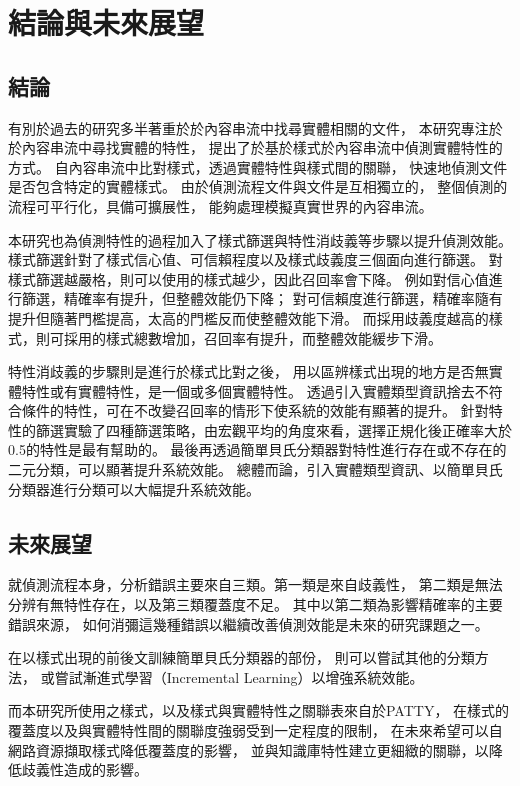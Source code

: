 %
%
%
\chapter{結論與未來展望}
\label{c:future}

\section{結論}
有別於過去的研究多半著重於於內容串流中找尋實體相關的文件，
本研究專注於於內容串流中尋找實體的特性，
提出了於基於樣式於內容串流中偵測實體特性的方式。
自內容串流中比對樣式，透過實體特性與樣式間的關聯，
快速地偵測文件是否包含特定的實體樣式。
由於偵測流程文件與文件是互相獨立的，
整個偵測的流程可平行化，具備可擴展性，
能夠處理模擬真實世界的內容串流。

本研究也為偵測特性的過程加入了樣式篩選與特性消歧義等步驟以提升偵測效能。
樣式篩選針對了樣式信心值、可信賴程度以及樣式歧義度三個面向進行篩選。
對樣式篩選越嚴格，則可以使用的樣式越少，因此召回率會下降。
例如對信心值進行篩選，精確率有提升，但整體效能仍下降；
對可信賴度進行篩選，精確率隨有提升但隨著門檻提高，太高的門檻反而使整體效能下滑。
而採用歧義度越高的樣式，則可採用的樣式總數增加，召回率有提升，而整體效能緩步下滑。

特性消歧義的步驟則是進行於樣式比對之後，
用以區辨樣式出現的地方是否無實體特性或有實體特性，是一個或多個實體特性。
透過引入實體類型資訊捨去不符合條件的特性，可在不改變召回率的情形下使系統的效能有顯著的提升。
針對特性的篩選實驗了四種篩選策略，由宏觀平均的角度來看，選擇正規化後正確率大於0.5的特性是最有幫助的。
最後再透過簡單貝氏分類器對特性進行存在或不存在的二元分類，可以顯著提升系統效能。
總體而論，引入實體類型資訊、以簡單貝氏分類器進行分類可以大幅提升系統效能。

\section{未來展望}
就偵測流程本身，分析錯誤主要來自三類。第一類是來自歧義性，
第二類是無法分辨有無特性存在，以及第三類覆蓋度不足。
其中以第二類為影響精確率的主要錯誤來源，
如何消彌這幾種錯誤以繼續改善偵測效能是未來的研究課題之一。

在以樣式出現的前後文訓練簡單貝氏分類器的部份，
則可以嘗試其他的分類方法，
或嘗試漸進式學習（Incremental Learning）以增強系統效能。

而本研究所使用之樣式，以及樣式與實體特性之關聯表來自於PATTY，
在樣式的覆蓋度以及與實體特性間的關聯度強弱受到一定程度的限制，
在未來希望可以自網路資源擷取樣式降低覆蓋度的影響，
並與知識庫特性建立更細緻的關聯，以降低歧義性造成的影響。

